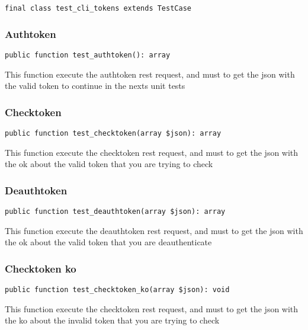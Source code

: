 \documentclass[a4paper]{article}
\begin{document}
\begin{lstlisting}
final class test_cli_tokens extends TestCase
\end{lstlisting}

\hypertarget{toc79}{}
\subsubsection{Authtoken}

\begin{lstlisting}
public function test_authtoken(): array
\end{lstlisting}

This function execute the authtoken rest request, and must to get the
json with the valid token to continue in the nexts unit tests

\hypertarget{toc80}{}
\subsubsection{Checktoken}

\begin{lstlisting}
public function test_checktoken(array $json): array
\end{lstlisting}

This function execute the checktoken rest request, and must to get the
json with the ok about the valid token that you are trying to check

\hypertarget{toc81}{}
\subsubsection{Deauthtoken}

\begin{lstlisting}
public function test_deauthtoken(array $json): array
\end{lstlisting}

This function execute the deauthtoken rest request, and must to get the
json with the ok about the valid token that you are deauthenticate

\hypertarget{toc82}{}
\subsubsection{Checktoken ko}

\begin{lstlisting}
public function test_checktoken_ko(array $json): void
\end{lstlisting}

This function execute the checktoken rest request, and must to get the
json with the ko about the invalid token that you are trying to check
\end{document}
